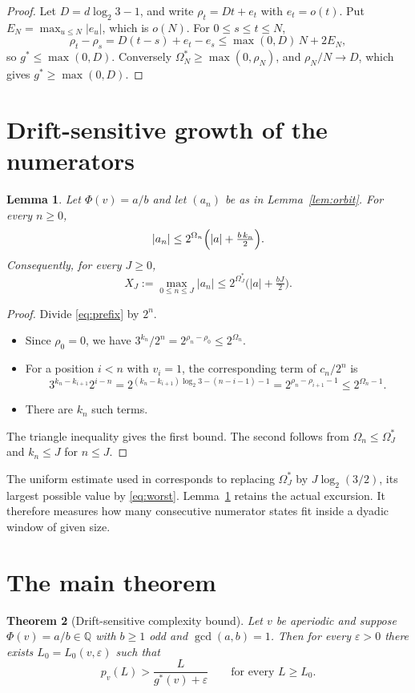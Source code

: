 \documentclass[11pt]{amsart}
\newtheorem{theorem}{Theorem}
\newtheorem{lemma}[theorem]{Lemma}
\theoremstyle{definition}
\theoremstyle{remark}
\newcommand{\Q}{\mathbb{Q}}
\newcommand{\gs}{g^{*}}
\newcommand{\Om}{\Omega^{*}}
\begin{document}
\begin{proof}
Let $D=d\log_2 3-1$, and write $\rho_t=Dt+e_t$ with $e_t=o(t)$. Put $E_N=\max_{u\le N}|e_u|$, which is $o(N)$. For $0\le s\le t\le N$,
\[
\rho_t-\rho_s=D(t-s)+e_t-e_s\le \max(0,D)\,N+2E_N,
\]
so $\gs\le\max(0,D)$. Conversely $\Om_N\ge\max(0,\rho_N)$, and $\rho_N/N\to D$, which gives $\gs\ge\max(0,D)$.
\end{proof}

\section{Drift-sensitive growth of the numerators}\label{sec:growth}

\begin{lemma}\label{lem:growth}
Let $\Phi(v)=a/b$ and let $(a_n)$ be as in Lemma~\ref{lem:orbit}. For every $n\ge0$,
\[
|a_n|\le 2^{\Omega_n}\Bigl(|a|+\tfrac{b\,k_n}{2}\Bigr).
\]
Consequently, for every $J\ge0$,
\[
X_J:=\max_{0\le n\le J}|a_n|\le 2^{\Om_J}\bigl(|a|+\tfrac{bJ}{2}\bigr).
\]
\end{lemma}

\begin{proof}
Divide \eqref{eq:prefix} by $2^n$.
\begin{itemize}[leftmargin=2em]
\item Since $\rho_0=0$, we have $3^{k_n}/2^n=2^{\rho_n-\rho_0}\le 2^{\Omega_n}$.
\item For a position $i<n$ with $v_i=1$, the corresponding term of $c_n/2^n$ is
\[
3^{k_n-k_{i+1}}2^{i-n}=2^{(k_n-k_{i+1})\log_2 3-(n-i-1)-1}=2^{\rho_n-\rho_{i+1}-1}\le 2^{\Omega_n-1}.
\]
\item There are $k_n$ such terms.
\end{itemize}
The triangle inequality gives the first bound. The second follows from $\Omega_n\le\Om_J$ and $k_n\le J$ for $n\le J$.
\end{proof}

The uniform estimate used in \cite{Dub09} corresponds to replacing $\Om_J$ by $J\log_2(3/2)$, its largest possible value by \eqref{eq:worst}. Lemma~\ref{lem:growth} retains the actual excursion. It therefore measures how many consecutive numerator states fit inside a dyadic window of given size.

\section{The main theorem}\label{sec:main}

\begin{theorem}[Drift-sensitive complexity bound]\label{thm:main}
Let $v$ be aperiodic and suppose $\Phi(v)=a/b\in\Q$ with $b\ge1$ odd and $\gcd(a,b)=1$. Then for every $\varepsilon>0$ there exists $L_0=L_0(v,\varepsilon)$ such that
\[
p_v(L)>\frac{L}{\gs(v)+\varepsilon}\qquad\text{for every }L\ge L_0 .
\]
\end{theorem}
\end{document}
